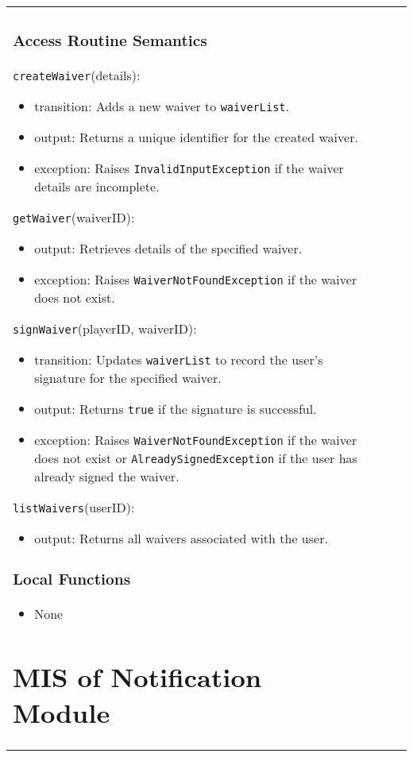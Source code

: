 \documentclass[12pt, titlepage]{article}
\begin{document}
\begin{center}
\begin{tabular}{|p{3cm}|p{4cm}|p{4cm}|p{4cm}|}
\begin{itemize}
\subsubsection{Access Routine Semantics}

\noindent \texttt{createWaiver}(details):  
\begin{itemize}
    \item transition: Adds a new waiver to \texttt{waiverList}.
    \item output: Returns a unique identifier for the created waiver.
    \item exception: Raises \texttt{InvalidInputException} if the waiver details are incomplete.
\end{itemize}

\noindent \texttt{getWaiver}(waiverID):  
\begin{itemize}
    \item output: Retrieves details of the specified waiver.
    \item exception: Raises \texttt{WaiverNotFoundException} if the waiver does not exist.
\end{itemize}

\noindent \texttt{signWaiver}(playerID, waiverID):  
\begin{itemize}
    \item transition: Updates \texttt{waiverList} to record the user's signature for the specified waiver.
    \item output: Returns \texttt{true} if the signature is successful.
    \item exception: Raises \texttt{WaiverNotFoundException} if the waiver does not exist or \texttt{AlreadySignedException} if the user has already signed the waiver.
\end{itemize}

\noindent \texttt{listWaivers}(userID):  
\begin{itemize}
    \item output: Returns all waivers associated with the user.
\end{itemize}

\subsubsection{Local Functions}
\begin{itemize}
    \item None
\end{itemize}

\section{MIS of Notification Module} \label{Module:Notification}


\end{itemize}
\end{tabular}
\end{center}
\end{document}
